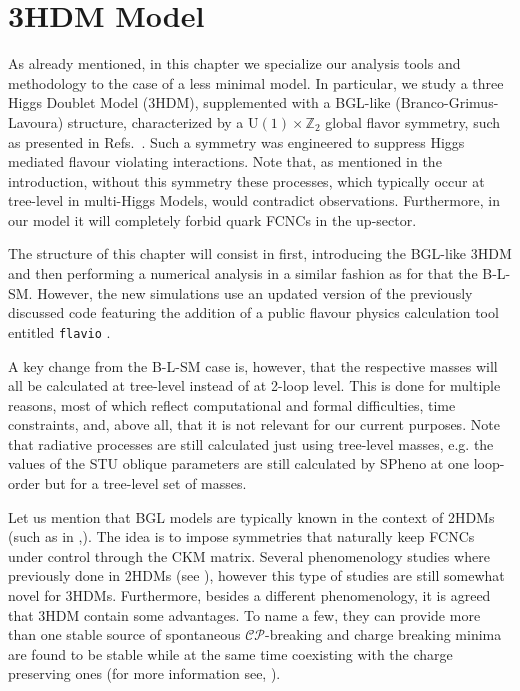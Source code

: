 \documentclass[10pt]{report}
\begin{document}
\chapter{3HDM Model}
\label{ch:3HDM}

As already mentioned, in this chapter we specialize our analysis tools and methodology to the case of a less minimal model. In particular, we study a three Higgs Doublet Model (3HDM), supplemented with a BGL-like (Branco-Grimus-Lavoura) structure, characterized by a $\mathrm{U}(1) \times \mathbb{Z}_2$ global flavor symmetry, such as presented in Refs.~\cite{Ludvig_Thesis,Ian_Thesis}. Such a symmetry was engineered to suppress Higgs mediated flavour violating interactions. Note that, as mentioned in the introduction, without this symmetry these processes, which typically occur at tree-level in multi-Higgs Models, would contradict observations. Furthermore, in our model it will completely forbid quark FCNCs in the up-sector. 

The structure of this chapter will consist in first, introducing the BGL-like 3HDM and then  performing a numerical analysis in a similar fashion as for that the B-L-SM. However, the new simulations use an updated version of the previously discussed code featuring the addition of a public flavour physics calculation tool entitled \texttt{flavio} \cite{straub2018flavio}. 

A key change from the B-L-SM case is, however, that the respective masses will all be calculated at tree-level instead of at 2-loop level. This is done for multiple reasons, most of which reflect computational and formal difficulties, time constraints, and, above all, that it is not relevant for our current purposes. Note that radiative processes are still calculated just using tree-level masses, e.g. the values of the STU oblique parameters are still calculated by SPheno at one loop-order but for a tree-level set of masses.   

Let us mention that BGL models are typically known in the context of 2HDMs (such as in ,\cite{Branco_1996}). The idea is to impose symmetries that naturally keep FCNCs under control through the CKM matrix. Several phenomenology studies where previously done in 2HDMs (see \cite{Botella_2016}), however this type of studies are still somewhat novel for 3HDMs. Furthermore, besides a different phenomenology, it is agreed that 3HDM contain some advantages. To name a few, they can provide more than one stable source of spontaneous $\mathcal{CP}$-breaking and charge breaking minima are found to be stable while at the same time coexisting with the charge preserving ones (for more information see, \cite{Barroso_2006}). 
\end{document}
